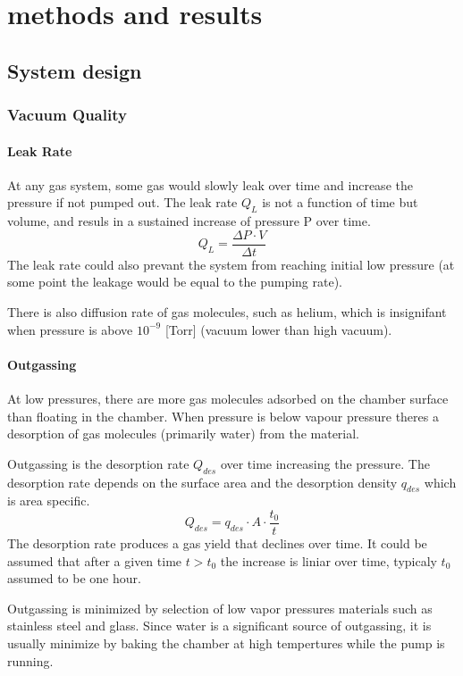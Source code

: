 \documentclass[\main/master.tex]{subfiles}
\begin{document}
\chapter{methods and results}\label{chp:example-2}
\section{System design}
\subsection{Vacuum Quality}
\subsubsection{Leak Rate}
At any gas system, some gas would slowly leak over time and increase the pressure if not pumped out. The leak rate $Q_L$ is not a function of time but volume, and resuls in a sustained increase of pressure P over time.
\begin{equation}
Q_L = \frac{\Delta P\cdot V}{\Delta t}  \label{eqn:energy-mass-equivalence-relation}
\end{equation}
The leak rate could also prevant the system from reaching initial low pressure (at some point the leakage would be equal to the pumping rate).
\par
There is also diffusion rate of gas molecules, such as helium, which is insignifant when pressure is above $10^{-9}$ [Torr] (vacuum lower than high vacuum). 

\subsubsection{Outgassing}
At low pressures, there are more gas molecules adsorbed on the chamber surface than floating in the chamber. When pressure is below vapour pressure theres a desorption of gas molecules (primarily water) from the material.
\par
Outgassing is the desorption rate $Q_{des}$ over time increasing the pressure. The desorption rate depends on the surface area and the desorption density $q_{des}$ which is area specific. 
\begin{equation}
Q_{des} = q_{des}\cdot A\cdot\frac{t_0}{t}  \label{eqn:energy-mass-equivalence-relation}
\end{equation}
The desorption rate produces a gas yield that declines over time. It could be assumed that after a given time $t>t_0$ the increase is liniar over time, typicaly $t_0$ assumed to be one hour.
\par
Outgassing is minimized by selection of low vapor pressures materials such as stainless steel and glass. Since water is a significant source of outgassing, it is usually minimize by baking the chamber at high tempertures while the pump is running.
\end{document}
